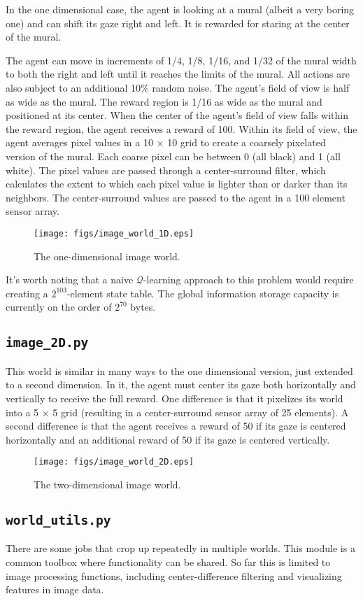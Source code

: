 In the one dimensional case, the agent is looking at a mural (albeit a very boring one) and can shift its gaze right and left. It is rewarded for staring at the center of the mural.

The agent can move in increments of 1/4, 1/8, 1/16, and 1/32 of the mural width to both the right and left until it reaches the limits of the mural. All actions are also subject to an additional 10\% random noise. The agent's field of view is half as wide as the mural. The reward region is 1/16 as wide as the mural and positioned at its center. When the center of the agent's field of view falls within the reward region, the agent receives a reward of 100. Within its field of view, the agent averages pixel values in a 10 $\times$ 10 grid to create a coarsely pixelated version of the mural. Each coarse pixel can be between 0 (all black) and 1 (all white). The pixel values are passed through a center-surround filter, which calculates the extent to which each pixel value is lighter than or darker than its neighbors. The center-surround values are passed to the agent in a 100 element sensor array.

\begin{figure}
\centering
\texttt{[image: figs/image\_world\_1D.eps]}
\caption{The one-dimensional image world.}
\label{image_1D}
\end{figure}

It's worth noting that a naive $\mathcal{Q}$-learning approach to this problem would require creating a $2^{103}$-element state table. The global information storage capacity is currently on the order of $2^{70}$ bytes.

\subsection{\texttt{image\_2D.py}}

This world is similar in many ways to the one dimensional version, just extended to a second dimension. In it, the agent must center its gaze both horizontally and vertically to receive the full reward. One difference is that it pixelizes its world into a 5 $\times$ 5 grid (resulting in a center-surround sensor array of 25 elements). A second difference is that the agent receives a reward of 50 if its gaze is centered horizontally and an additional reward of 50 if its gaze is centered vertically. 

\begin{figure}
\centering
\texttt{[image: figs/image\_world\_2D.eps]}
\caption{The two-dimensional image world.}
\label{image_2D}
\end{figure}

\subsection{\texttt{world\_utils.py}}

There are some jobs that crop up repeatedly in multiple worlds. This module is a common toolbox where functionality can be shared. So far this is limited to image processing functions, including center-difference filtering and visualizing features in image data.

